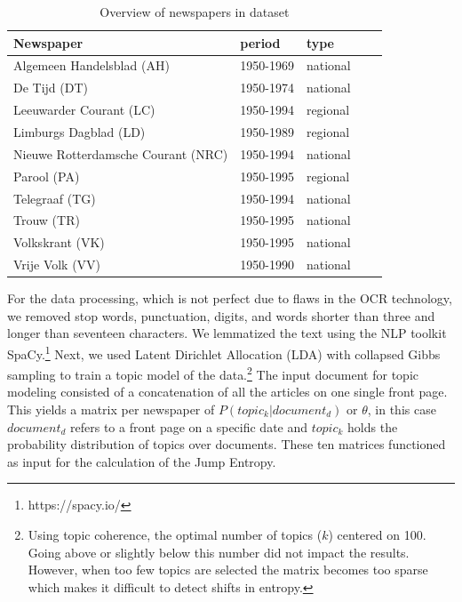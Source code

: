 \documentclass[]{ceurart}
\begin{document}
\begin{table}[]
    \caption{Overview of newspapers in dataset}
    \begin{tabular}{@{}lllll@{}}
        \toprule
            Newspaper & period & type &  \\ \midrule
            Algemeen Handelsblad (AH)           & 1950-1969 &  national &  \\
            De Tijd (DT)                        & 1950-1974 &  national &  \\
            Leeuwarder Courant (LC)             & 1950-1994 &  regional &  \\
            Limburgs Dagblad (LD)               & 1950-1989 &  regional &  \\ 
            Nieuwe Rotterdamsche Courant (NRC)  & 1950-1994 &  national &  \\ 
            Parool (PA)                         & 1950-1995 &  regional &  \\ 
            Telegraaf (TG)                      & 1950-1994 &  national &  \\ 
            Trouw (TR)                          & 1950-1995 &  national &  \\ 
            Volkskrant (VK)                     & 1950-1995 &  national &  \\ 
            Vrije Volk (VV)                     & 1950-1990 &  national &  \\ 
        \bottomrule
    \end{tabular}
    \label{tab:data-overview}
\end{table}

For the data processing, which is not perfect due to flaws in the OCR technology, we removed stop words, punctuation, digits, and words shorter than three and longer than seventeen characters. We lemmatized the text using the NLP toolkit SpaCy.\footnote{https://spacy.io/} Next, we used Latent Dirichlet Allocation (LDA) with collapsed Gibbs sampling to train a topic model of the data.\footnote{Using topic coherence, the optimal number of topics ($k$) centered on 100. Going above or slightly below this number did not impact the results. However, when too few topics are selected the matrix becomes too sparse which makes it difficult to detect shifts in entropy.} 
The input document for topic modeling consisted of a concatenation of all the articles on one single front page. This yields a matrix per newspaper of $P(topic_k|document_d)$ or $\theta$, in this case $document_d$ refers to a front page on a specific date and $topic_k$ holds the probability distribution of topics over documents. These ten matrices functioned as input for the calculation of the Jump Entropy. 
\end{document}
